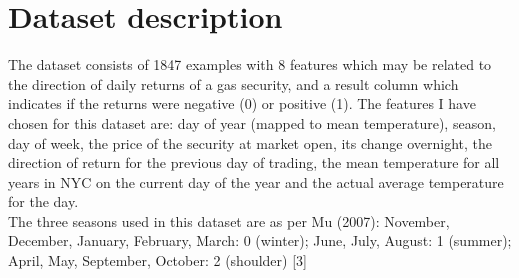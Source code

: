 \documentclass[conference,letterpaper]{IEEEtran}
\begin{document}
\section{Dataset description}
The dataset consists of 1847 examples with 8 features which may be related to the direction of daily returns of a gas security,
and a result column which indicates if the returns were negative (0) or positive (1). The features I have chosen for this dataset 
are: day of year (mapped to mean temperature), season, day of week, the price of the security at market open, its change overnight, 
the direction of return for the previous day of trading, the mean temperature for all years in NYC on the current day of the year
and the actual average temperature for the day.\\
The three seasons used in this dataset are as per Mu (2007): 
November, December, January, February, March: 0 (winter); 
June, July, August: 1 (summer); 
April, May, September, October: 2 (shoulder) [3] \\
\end{document}
